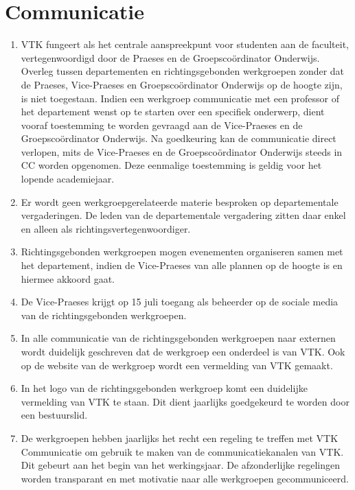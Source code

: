 \section{Communicatie}
\begin{enumerate}
    \item VTK fungeert als het centrale aanspreekpunt voor studenten aan de faculteit, vertegenwoordigd door de Praeses en de Groepscoördinator Onderwijs. Overleg tussen departementen en richtingsgebonden werkgroepen zonder dat de Praeses, Vice-Praeses en Groepscoördinator Onderwijs op de hoogte zijn, is niet toegestaan. Indien een werkgroep communicatie met een professor of het departement wenst op te starten over een specifiek onderwerp, dient vooraf toestemming te worden gevraagd aan de Vice-Praeses en de Groepscoördinator Onderwijs. Na goedkeuring kan de communicatie direct verlopen, mits de Vice-Praeses en de Groepscoördinator Onderwijs steeds in CC worden opgenomen. Deze eenmalige toestemming is geldig voor het lopende academiejaar.
    \item Er wordt geen werkgroepgerelateerde materie besproken op departementale vergaderingen. De leden van de departementale vergadering zitten daar enkel en alleen als richtingsvertegenwoordiger.
    \item Richtingsgebonden werkgroepen mogen evenementen organiseren samen met het departement, indien de Vice-Praeses van alle plannen op de hoogte is en hiermee akkoord gaat.
    \item De Vice-Praeses krijgt op 15 juli toegang als beheerder op de sociale media van de richtingsgebonden werkgroepen.
    \item In alle communicatie van de richtingsgebonden werkgroepen naar externen wordt duidelijk geschreven dat de werkgroep een onderdeel is van VTK. Ook op de website van de werkgroep wordt een vermelding van VTK gemaakt.
    \item In het logo van de richtingsgebonden werkgroep komt een duidelijke vermelding van VTK te staan. Dit dient jaarlijks goedgekeurd te worden door een bestuurslid.
    \item De werkgroepen hebben jaarlijks het recht een regeling te treffen met VTK Communicatie om gebruik te maken van de communicatiekanalen van VTK. Dit gebeurt aan het begin van het werkingsjaar. De afzonderlijke regelingen worden transparant en met motivatie naar alle werkgroepen gecommuniceerd.
\end{enumerate}

